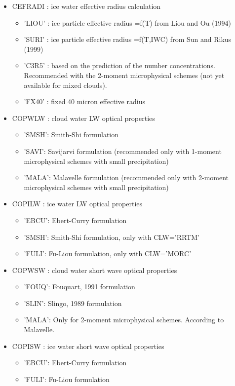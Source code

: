 \begin{itemize}
\item
{}
CEFRADI :  ice water effective radius calculation
\begin{itemize}
\item 'LIOU' : ice particle effective radius =f(T) from Liou and Ou (1994)
\item 'SURI' : ice particle effective radius =f(T,IWC) from Sun and Rikus (1999)
\item 'C3R5' : based on the prediction of the number concentrations.
Recommended with the 2-moment microphysical schemes (not yet available for mixed clouds).
\item 'FX40' : fixed 40 micron effective radius
\end{itemize}

\item
{}
COPWLW : cloud water LW optical properties
\begin{itemize}
\item 'SMSH': Smith-Shi formulation
\item 'SAVI': Savijarvi formulation (recommended only with 1-moment microphysical schemes
with small precipitation)
\item 'MALA': Malavelle formulation (recommended only with 2-moment microphysical schemes
with small precipitation)
\end{itemize}

\item
{}
COPILW : ice water  LW optical properties
\begin{itemize}
\item 'EBCU': Ebert-Curry formulation
\item 'SMSH': Smith-Shi formulation, only with CLW='RRTM'
\item 'FULI': Fu-Liou  formulation, only with CLW='MORC'
\end{itemize}

\item
{}
COPWSW : cloud water short wave optical properties
\begin{itemize}
\item 'FOUQ': Fouquart, 1991 formulation
\item 'SLIN': Slingo, 1989 formulation
\item 'MALA': Only for 2-moment microphysical schemes. According to Malavelle.
\end{itemize}

\item
{}
COPISW : ice water short wave optical properties  
\begin{itemize}
\item 'EBCU': Ebert-Curry formulation
\item 'FULI': Fu-Liou formulation
\end{itemize}


\end{itemize}
